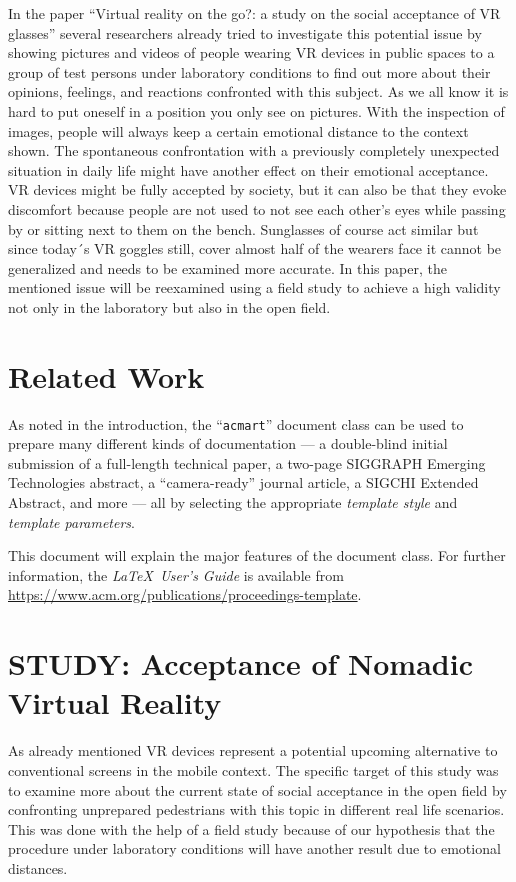 \documentclass[sigchi]{acmart}
\begin{document}
In the paper “Virtual reality on the go?: a study on the social acceptance of VR glasses” \cite{schwind2018virtual} several researchers already tried to investigate this potential issue by showing pictures and videos of people wearing VR devices in public spaces to a group of test persons under laboratory conditions to find out more about their opinions, feelings, and reactions confronted with this subject. As we all know it is hard to put oneself in a position you only see on pictures. With the inspection of images, people will always keep a certain emotional distance to the context shown. 
The spontaneous confrontation with a previously completely unexpected situation in daily life might have another effect on their emotional acceptance. VR devices might be fully accepted by society, but it can also be that they evoke discomfort because people are not used to not see each other's eyes while passing by or sitting next to them on the bench. Sunglasses of course act similar but since today´s VR goggles still, cover almost half of the wearers face it cannot be generalized and needs to be examined more accurate.
In this paper, the mentioned issue will be reexamined using a field study to achieve a high validity not only in the laboratory but also in the open field.

\section{Related Work}
As noted in the introduction, the ``\verb|acmart|'' document class can
be used to prepare many different kinds of documentation --- a
double-blind initial submission of a full-length technical paper, a
two-page SIGGRAPH Emerging Technologies abstract, a ``camera-ready''
journal article, a SIGCHI Extended Abstract, and more --- all by
selecting the appropriate {\itshape template style} and {\itshape
  template parameters}.

This document will explain the major features of the document
class. For further information, the {\itshape \LaTeX\ User's Guide} is
available from
\url{https://www.acm.org/publications/proceedings-template}.

\section{STUDY: Acceptance of Nomadic Virtual Reality}

As already mentioned VR devices represent a potential upcoming alternative to conventional screens in the mobile context. The specific target of this study was to examine more about the current state of social acceptance in the open field by confronting unprepared pedestrians with this topic in different real life scenarios. This was done with the help of a field study because of our hypothesis that the procedure under laboratory conditions will have another result due to emotional distances.
\end{document}
